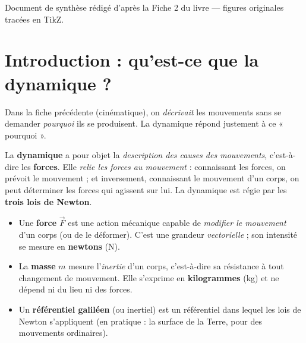 \documentclass[11pt,a4paper]{article}
\newcommand{\vv}[1]{\vec{#1}}
\begin{document}
\vspace{0.5cm}
{\small\color{black!60} Document de synthèse rédigé d'après la Fiche 2 du livre — figures originales tracées en TikZ.}
\par
\endgroup

\newpage
\renewcommand{\contentsname}{\textcolor{primarydark}{Table des matières}}
\tableofcontents
\thispagestyle{fancy}
\newpage

\section{Introduction : qu'est-ce que la dynamique ?}
Dans la fiche précédente (cinématique), on \emph{décrivait} les mouvements sans se demander
\emph{pourquoi} ils se produisent. La dynamique répond justement à ce « pourquoi ».

\begin{definition}[la dynamique]
La \textbf{dynamique} a pour objet la \emph{description des causes des mouvements}, c'est-à-dire
les \textbf{forces}. Elle \emph{relie les forces au mouvement} : connaissant les forces, on prévoit
le mouvement ; et inversement, connaissant le mouvement d'un corps, on peut déterminer les
forces qui agissent sur lui. La dynamique est régie par les \textbf{trois lois de Newton}.
\end{definition}

\begin{definition}
\begin{itemize}[leftmargin=1.6em,topsep=2pt,itemsep=1.5pt]
  \item Une \textbf{force} $\vv F$ est une action mécanique capable de \emph{modifier le mouvement}
        d'un corps (ou de le déformer). C'est une grandeur \emph{vectorielle} ; son intensité se
        mesure en \textbf{newtons} (\si{\newton}).
  \item La \textbf{masse} $m$ mesure l'\emph{inertie} d'un corps, c'est-à-dire sa résistance à tout
        changement de mouvement. Elle s'exprime en \textbf{kilogrammes} (\si{\kilogram}) et ne dépend
        ni du lieu ni des forces.
  \item Un \textbf{référentiel galiléen} (ou inertiel) est un référentiel dans lequel les lois de
        Newton s'appliquent (en pratique : la surface de la Terre, pour des mouvements ordinaires).
\end{itemize}
\end{definition}
\end{document}
